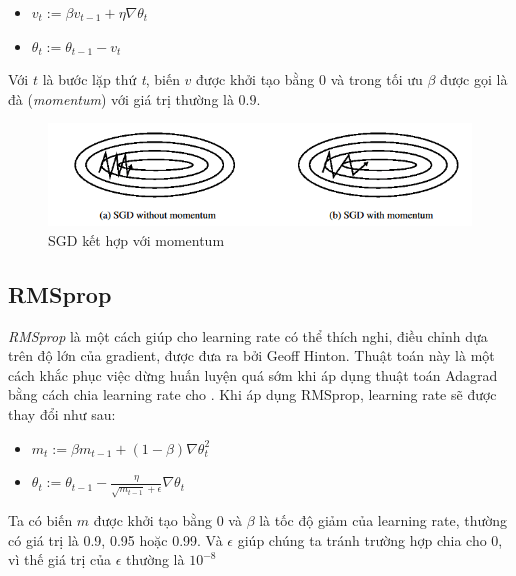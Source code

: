 \begin{itemize}
\item[] $v_t:= \beta v_{t-1} +\eta \nabla\theta_{t}$
\item[]  $ \theta_t:= \theta_{t-1} - v_t$
\end{itemize}
Với $t$ là bước lặp thứ \textit{t}, biến $v$ được khởi tạo bằng 0 và trong tối ưu $\beta$ được gọi là đà (\textit{momentum}) với giá trị thường là $0.9$.
\begin{figure}[H]
\begin{center}
\includegraphics[scale=1]{chap3/image/sgd_momentum.png}
\caption{SGD kết hợp với momentum }
\end{center}
\end{figure}


%
%

\subsection{RMSprop}
 \textit{RMSprop} \cite{rmsprop} là một cách giúp cho learning rate có thể thích nghi, điều chỉnh dựa trên độ lớn của gradient, được đưa ra bởi Geoff Hinton. Thuật toán này là một cách khắc phục việc dừng huấn luyện quá sớm khi áp dụng thuật toán Adagrad bằng cách chia learning rate cho . Khi áp dụng RMSprop, learning rate sẽ được thay đổi như sau:
\begin{itemize}
\item[] $m_t := \beta m_{t-1} + (1-\beta) \nabla\theta_{t}^2  $
\item[] $\theta_t := \theta_{t-1} - \frac{\eta}{\sqrt{m_{t-1}}+\epsilon}\nabla\theta_{t}$
\end{itemize}
Ta có biến $m$ được khởi tạo bằng 0 và $\beta$ là tốc độ giảm của learning rate, thường có giá trị là 0.9, 0.95 hoặc 0.99. Và $\epsilon$ giúp chúng ta tránh trường hợp chia cho 0, vì thế giá trị của $\epsilon$ thường là $10^{-8}$ 
